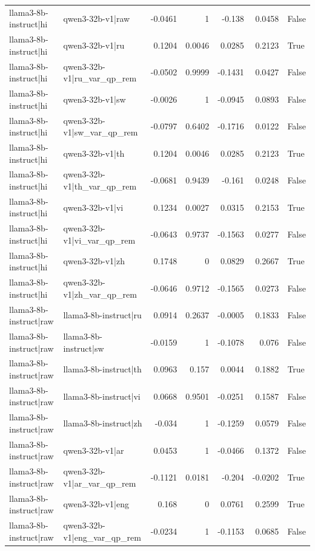 \begin{table}
\begin{tabular}{l l r r r r l}
llama3-8b-instruct|hi & qwen3-32b-v1|raw & -0.0461 & 1 & -0.138 & 0.0458 & False \\
llama3-8b-instruct|hi & qwen3-32b-v1|ru & 0.1204 & 0.0046 & 0.0285 & 0.2123 & True \\
llama3-8b-instruct|hi & qwen3-32b-v1|ru_var_qp_rem & -0.0502 & 0.9999 & -0.1431 & 0.0427 & False \\
llama3-8b-instruct|hi & qwen3-32b-v1|sw & -0.0026 & 1 & -0.0945 & 0.0893 & False \\
llama3-8b-instruct|hi & qwen3-32b-v1|sw_var_qp_rem & -0.0797 & 0.6402 & -0.1716 & 0.0122 & False \\
llama3-8b-instruct|hi & qwen3-32b-v1|th & 0.1204 & 0.0046 & 0.0285 & 0.2123 & True \\
llama3-8b-instruct|hi & qwen3-32b-v1|th_var_qp_rem & -0.0681 & 0.9439 & -0.161 & 0.0248 & False \\
llama3-8b-instruct|hi & qwen3-32b-v1|vi & 0.1234 & 0.0027 & 0.0315 & 0.2153 & True \\
llama3-8b-instruct|hi & qwen3-32b-v1|vi_var_qp_rem & -0.0643 & 0.9737 & -0.1563 & 0.0277 & False \\
llama3-8b-instruct|hi & qwen3-32b-v1|zh & 0.1748 & 0 & 0.0829 & 0.2667 & True \\
llama3-8b-instruct|hi & qwen3-32b-v1|zh_var_qp_rem & -0.0646 & 0.9712 & -0.1565 & 0.0273 & False \\
llama3-8b-instruct|raw & llama3-8b-instruct|ru & 0.0914 & 0.2637 & -0.0005 & 0.1833 & False \\
llama3-8b-instruct|raw & llama3-8b-instruct|sw & -0.0159 & 1 & -0.1078 & 0.076 & False \\
llama3-8b-instruct|raw & llama3-8b-instruct|th & 0.0963 & 0.157 & 0.0044 & 0.1882 & True \\
llama3-8b-instruct|raw & llama3-8b-instruct|vi & 0.0668 & 0.9501 & -0.0251 & 0.1587 & False \\
llama3-8b-instruct|raw & llama3-8b-instruct|zh & -0.034 & 1 & -0.1259 & 0.0579 & False \\
llama3-8b-instruct|raw & qwen3-32b-v1|ar & 0.0453 & 1 & -0.0466 & 0.1372 & False \\
llama3-8b-instruct|raw & qwen3-32b-v1|ar_var_qp_rem & -0.1121 & 0.0181 & -0.204 & -0.0202 & True \\
llama3-8b-instruct|raw & qwen3-32b-v1|eng & 0.168 & 0 & 0.0761 & 0.2599 & True \\
llama3-8b-instruct|raw & qwen3-32b-v1|eng_var_qp_rem & -0.0234 & 1 & -0.1153 & 0.0685 & False \\

\end{tabular}
\end{table}
